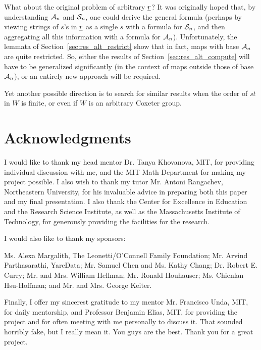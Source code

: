 What about the original problem of arbitrary $\ul r$?  It was originally hoped that, by understanding $\AA_n$ and $\SS_n$, one could derive the general formula (perhaps by viewing strings of $s$'s in $\ul r$ as a single $s$ with a formula for $\SS_n$, and then aggregating all this information with a formula for $\AA_n$).  Unfortunately, the lemmata of Section~\ref{sec:res_alt_restrict} show that in fact, maps with base $\AA_n$ are quite restricted.  So, either the results of Section~\ref{sec:res_alt_compute} will have to be generalized significantly (in the context of maps outside those of base $\AA_n$), or an entirely new approach will be required.

Yet another possible direction is to search for similar results when the order of $st$ in $W$ is finite, or even if $W$ is an arbitrary Coxeter group.

\section{Acknowledgments} 
I would like to thank my head mentor Dr. Tanya Khovanova, MIT, for providing individual discussion with me, and the MIT Math Department for making my project possible.
I also wish to thank my tutor Mr. Antoni Rangachev, Northeastern University, for his invaluable advice in preparing both this paper and my final presentation.
I also thank the Center for Excellence in Education and the Research Science Institute, as well as the Massachusetts Institute of Technology, for generously providing the facilities for the research.

I would also like to thank my sponsors:
\begin{inparaenum}[]
	\ii Ms. Alexa Margalith, The Leonetti\slash O'Connell Family Foundation;
	\ii Mr. Arvind Parthasarathi, YarcData;
	\ii Mr. Samuel Chen and Ms. Kathy Chang;
	\ii Dr. Robert E. Curry;
	\ii Mr. and Mrs. William Hellman;
	\ii Mr. Ronald Houhauser;
	\ii Ms. Chienlan Hsu-Hoffman; and
	\ii Mr. and Mrs. George Keiter.
\end{inparaenum}

Finally, I offer my sincerest gratitude to my mentor Mr. Francisco Unda, MIT, for daily mentorship, and Professor Benjamin Elias, MIT, for providing the project and for often meeting with me personally to discuss it.
That sounded horribly fake, but I really mean it.  You guys are the best.  Thank you for a great project.
